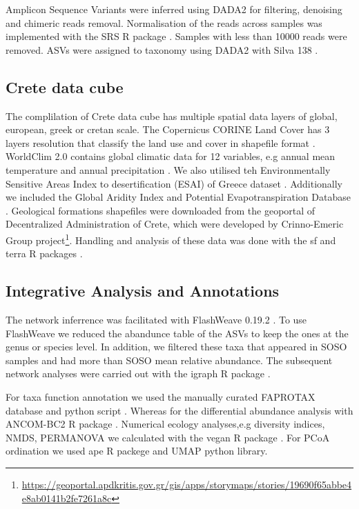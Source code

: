 Amplicon Sequence Variants were inferred using DADA2 \parencite{Callahan2016} for 
filtering, denoising and chimeric reads removal. Normalisation of the reads
across samples was implemented with the SRS R package \parencite{Beule2020}. Samples
with less than 10000 reads were removed. ASVs were assigned to taxonomy using 
DADA2 with Silva 138 \parencite{quast_silva_2013}.

\subsection{Crete data cube}\label{data}

The complilation of Crete data cube has multiple spatial data layers of global,
european, greek or cretan scale. 
The Copernicus CORINE Land Cover has 3 layers resolution that classify the land
use and cover in shapefile format \parencite{CLC2023}. 
WorldClim 2.0 contains global climatic data for 12 variables, e.g annual mean
temperature and annual precipitation \parencite{Fick2017}.
We also utilised teh Environmentally Sensitive Areas Index to desertification (ESAI) 
of Greece dataset \parencite{KARAMESOUTI2018266}. Additionally we included the 
Global Aridity Index and Potential Evapotranspiration Database \parencite{zomer2022version}.
Geological formations shapefiles were downloaded from the geoportal of
Decentralized Administration of Crete, which were developed by
Crinno-Emeric Group project\footnote{\url{https://geoportal.apdkritis.gov.gr/gis/apps/storymaps/stories/19690f65abbe4e8ab0141b2fe7261a8c}}.
Handling and analysis of these data was done with the sf and terra R packages \parencite{Pebesma2023}.

\subsection{Integrative Analysis and Annotations}\label{int_analysis}
The network inferrence was facilitated with FlashWeave 0.19.2 \parencite{Tackmann2019}.
To use FlashWeave we reduced 
the abandunce table of the ASVs to keep the ones at the genus or species level.
In addition, we filtered these taxa that appeared in SOSO samples and had more than 
SOSO mean relative abundance. The subsequent network analyses were carried out
with the igraph R package \parencite{Csardi2006}.

For taxa function annotation we used the manually curated FAPROTAX database and python script \parencite{loucaDecouplingFunctionTaxonomy2016}.
Whereas for the differential abundance analysis with ANCOM-BC2 R package \parencite{Lin2023}.
Numerical ecology analyses,e.g diversity indices, NMDS, PERMANOVA we calculated
with the vegan R package \parencite{oksanen2024vegan}.
For PCoA ordination we used ape R packege \parencite{Paradis2004} and UMAP python library\parencite{mcinnes2018umap-software}.

